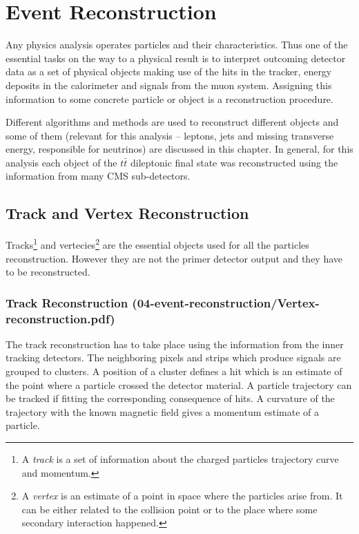 \chapter{Event Reconstruction}\label{chapt:event_selection}

Any physics analysis operates particles and their characteristics. Thus one of the essential tasks on the way to a physical
result is to interpret outcoming detector data as a set of physical objects making use of the hits
in the tracker, energy deposits in the calorimeter and signals from the muon system. Assigning this information to some concrete particle 
or object is a reconstruction procedure.

Different algorithms and methods are used to reconstruct different objects and some of them (relevant for this analysis -- leptons, jets and missing transverse
energy, responsible for neutrinos) are discussed in this
chapter. In general, for this analysis each object of the $t\bar{t}$ dileptonic final state was reconstructed using the information from many
CMS sub-detectors.

\section{Track and Vertex Reconstruction}

Tracks\footnote{A \textit{track} is a set of information about the charged particles trajectory curve and momentum.} and vertecies\footnote{A 
\textit{vertex} is an estimate of a point in space where the particles arise from. It can be either related to the 
collision point or to the place  where some secondary interaction happened.} are the essential objects used for all the particles reconstruction. 
However they are not the primer detector output and they have to be reconstructed.

\subsection{Track Reconstruction (04-event-reconstruction/Vertex-reconstruction.pdf)}\label{ssec:trkReco}

The track reconstruction has to take place using the information from the inner tracking detectors. The neighboring pixels and strips which
produce signals are grouped to clusters. A position of a cluster defines a hit which is an estimate of the point where a particle crossed the
detector material. A particle trajectory can be tracked if fitting the corresponding consequence of hits. A curvature 
of the trajectory with the known magnetic field gives a momentum estimate of a particle.

